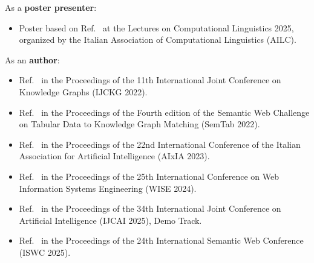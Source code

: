 As a \textbf{poster presenter}:
\begin{itemize}
    \item Poster based on Ref.~\cite{Pozzi2025ReFactX} at the Lectures on Computational Linguistics 2025, organized by the Italian Association of Computational Linguistics (AILC).
\end{itemize}

As an \textbf{author}:
\begin{itemize}
	\item Ref.~\cite{ijckg2022} in the Proceedings of the 11th International Joint Conference on Knowledge Graphs (IJCKG 2022).
	\item Ref.~\cite{mammotab} in the Proceedings of the Fourth edition of the Semantic Web Challenge on Tabular Data to Knowledge Graph Matching (SemTab 2022).
	\item Ref.~\cite{aixia_2023} in the Proceedings of the 22nd International Conference of the Italian Association for Artificial Intelligence (AIxIA 2023).
	\item Ref.~\cite{pozzi_wise_2025} in the Proceedings of the 25th International Conference on Web Information Systems Engineering (WISE 2024).
	\item Ref.~\cite{Agazzi2025DAVE} in the Proceedings of the 34th International Joint Conference on Artificial Intelligence (IJCAI 2025), Demo Track.
	\item Ref.~\cite{Pozzi2025ReFactX} in the Proceedings of the 24th International Semantic Web Conference (ISWC 2025).
\end{itemize}

\clearpage
\tableofcontents

\clearpage
\listoffigures
\clearpage
\listoftables
\clearpage
\printacronyms[heading=chapter*,name=List of Acronyms]
\clearpage

\pagestyle{mystyle}


